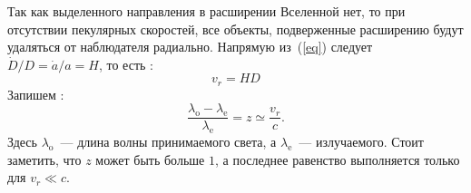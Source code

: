 Так как выделенного направления в расширении Вселенной нет, то при отсутствии пекулярных скоростей, все объекты, подверженные расширению будут удаляться от наблюдателя радиально. Напрямую из~(\ref{eq}) следует $\dot{D} \slash D = \dot{a} \slash a = H$, то есть :
\begin{equation}
v_r = HD
\label{hubble}
\end{equation}
Запишем :
\begin{equation}
\frac{\lambda_\text{o} - \lambda_\text{e}}{\lambda_\text{e}} = z \simeq \frac{v_r}{c}.
\end{equation}
Здесь $\lambda_\text{o}$~--- длина волны принимаемого света, а $\lambda_\text{e}$~--- излучаемого. Стоит заметить, что  $z$ может быть больше $1$, а последнее равенство выполняется только для $v_r \ll c.$

